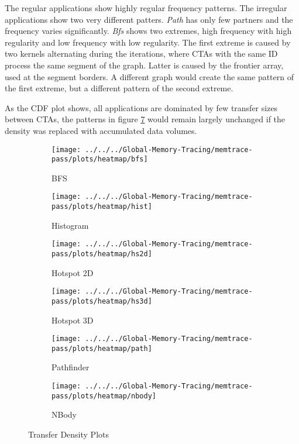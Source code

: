 The regular applications show highly regular frequency patterns. The irregular applications show two very different patters. \textit{Path} has only few partners and the frequency varies significantly. \textit{Bfs} shows two extremes, high frequency with high regularity and low frequency with low regularity.
The first extreme is caused by two kernels alternating during the iterations, where CTAs with the same ID process the same segment of the graph.  Latter is caused by the frontier array, used at the segment borders. A different graph would create the same pattern of the first extreme, but a different pattern of the second extreme.

As the CDF plot shows, all applications are dominated by few transfer sizes between CTAs, the patterns in figure \ref{fig:density-plots} would remain largely unchanged if the density was replaced with accumulated data volumes.
\begin{figure}[h!]
	\begin{subfigure}[b]{0.45\textwidth}
		\texttt{[image: ../../../Global-Memory-Tracing/memtrace-pass/plots/heatmap/bfs]}
		\caption{BFS}
		\label{fig:density-bfs}
	\end{subfigure}
	\begin{subfigure}[b]{0.45\textwidth}
		\texttt{[image: ../../../Global-Memory-Tracing/memtrace-pass/plots/heatmap/hist]}
		\caption{Histogram}
		\label{fig:density-hist}
	\end{subfigure}
	\begin{subfigure}[b]{0.45\textwidth}
		\texttt{[image: ../../../Global-Memory-Tracing/memtrace-pass/plots/heatmap/hs2d]}
		\caption{Hotspot 2D}
		\label{fig:density-hs2d}
	\end{subfigure}
	\begin{subfigure}[b]{0.45\textwidth}
		\texttt{[image: ../../../Global-Memory-Tracing/memtrace-pass/plots/heatmap/hs3d]}
		\caption{Hotspot 3D}
		\label{fig:density-hs3d}
	\end{subfigure}
	\begin{subfigure}[b]{0.45\textwidth}
		\texttt{[image: ../../../Global-Memory-Tracing/memtrace-pass/plots/heatmap/path]}
		\caption{Pathfinder}
		\label{fig:density-path}
	\end{subfigure}
	\hfill
	\begin{subfigure}[b]{0.45\textwidth}
		\texttt{[image: ../../../Global-Memory-Tracing/memtrace-pass/plots/heatmap/nbody]}
		\caption{NBody}
		\label{fig:density-nbody}
	\end{subfigure}
	\caption{Transfer Density Plots}
	\label{fig:density-plots}
\end{figure}
